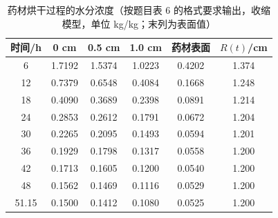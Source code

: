 \begin{table}[H]
\centering
\caption{药材烘干过程的水分浓度（按题目表 6 的格式要求输出，收缩模型，单位 kg/kg；末列为表面值）}
\label{tab:q4}
\begin{tabular}{c|ccccc}
\toprule
时间/h & 0 cm & 0.5 cm & 1.0 cm & 药材表面 & $R(t)$/cm \\
\midrule
6 & 1.7192 & 1.5374 & 1.0223 & 0.4202 & 1.374 \\
12 & 0.7379 & 0.6548 & 0.4084 & 0.1668 & 1.248 \\
18 & 0.4090 & 0.3689 & 0.2398 & 0.0891 & 1.214 \\
24 & 0.2853 & 0.2612 & 0.1791 & 0.0672 & 1.204 \\
30 & 0.2265 & 0.2095 & 0.1493 & 0.0594 & 1.201 \\
36 & 0.1929 & 0.1798 & 0.1317 & 0.0558 & 1.200 \\
42 & 0.1713 & 0.1605 & 0.1200 & 0.0540 & 1.200 \\
48 & 0.1562 & 0.1469 & 0.1116 & 0.0529 & 1.200 \\
51.15 & 0.1500 & 0.1412 & 0.1080 & 0.0525 & 1.200 \\
\bottomrule
\end{tabular}
\end{table}
